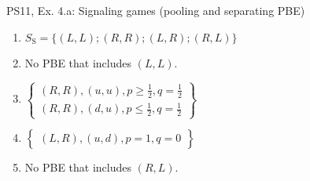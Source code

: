 \begin{frame}{PS11, Ex. 4.a: Signaling games (pooling and separating PBE)}
\begin{multicols}{2}
\begin{figure}[!h]
      \end{figure} \vspace{-8pt}
      \begin{enumerate}
        \item $S_\text{S}=\{(L,L);(R,R);(L,R);(R,L)\}$
        \item No PBE that includes $(L,L)$.
        \item $\left\{\begin{array}{c}
            (R,R),(u,u),p\geq\frac{1}{2},q=\frac{1}{2}\\
            (R,R),(d,u),p\leq\frac{1}{2},q=\frac{1}{2}\end{array}\right\}$
        \item $\left\{\begin{array}{c}(L,R),(u,d),p=1,q=0\end{array}\right\}$
        \item No PBE that includes $(R,L)$.
      \end{enumerate}
      \vfill\null
    \end{multicols}
\end{frame}
